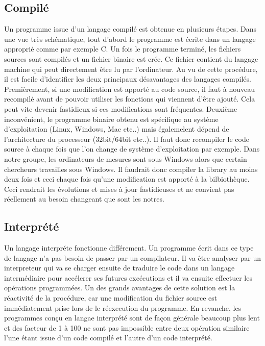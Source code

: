 \subsection{Compilé}
Un programme issue d'un langage compilé est obtenue en plusieurs étapes. Dans une vue très schématique, tout d'abord le programme est écrite dans un langage approprié comme par exemple C. Un fois le programme terminé, les fichiers sources sont compilés et un fichier binaire est crée. Ce fichier contient du langage machine qui peut directement être lu par l'ordinateur. Au vu de cette procédure, il est facile d'identifier les deux principaux désavantages des langages compilés. Premièrement, si une modification est apporté au code source, il faut à nouveau recompilé avant de pouvoir utiliser les fonctions qui viennent d'être ajouté. Cela peut vite devenir fastidieux si ces modifications sont fréquentes. Deuxième inconvénient, le programme binaire obtenu est spécifique au système d'exploitation (Linux, Windows, Mac etc..) mais égalemelent dépend de l'architecture du processeur (32bit/64bit etc..). Il faut donc recompiler le code source à chaque fois que l'on change de système d'exploitation par exemple. Dans notre groupe, les ordinateurs de mesures sont sous Windows alors que certain chercheurs travailles sous Windows. Il faudrait donc compiler la library au moins deux fois et ceci chaque fois qu'une modification est apporté à la bilbiothèque. Ceci rendrait les évolutions et mises à jour fastidieuses et ne convient pas réellement au besoin changeant que sont les notres. 

\subsection{Interprété}
Un langage interpréte fonctionne différement. Un programme écrit dans ce type de langage n'a pas besoin de passer par un compilateur. Il va être analyser par un interpreteur qui va se charger ensuite de traduire le code dans un langage intermédiaire pour accélerer ses futures excécutions et il va ensuite effectuer les opérations programmées. Un des grands avantages de cette solution est la réactivité de la procédure, car une modification du fichier source est immédiatement prise lors de le réexecution du programme. En revanche, les programmes conçu en langae interprété sont de façon générale beaucoup plus lent et des facteur de 1 à 100 ne sont pas impossible entre deux opération similaire l'une étant issue d'un code compilé et l'autre d'un code interprété.

